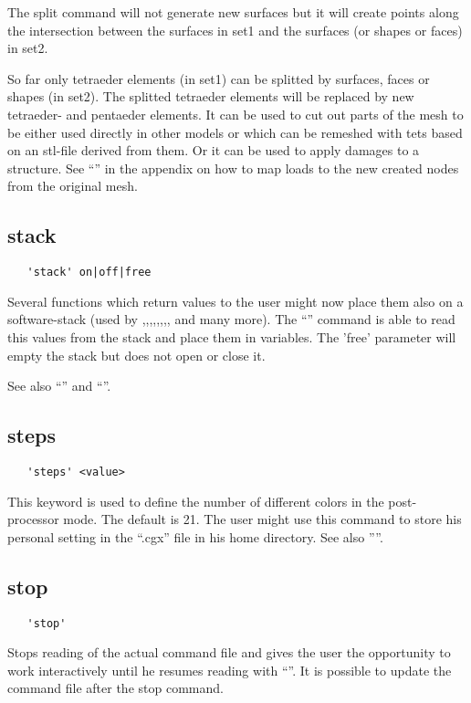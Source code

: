 \documentclass{article}
\begin{document}
The split command will not generate new surfaces but it will create points along the intersection between the surfaces in set1 and the surfaces (or shapes or faces) in set2.

So far only tetraeder elements (in set1) can be splitted by surfaces, faces or shapes (in set2). The splitted tetraeder elements will be replaced by new tetraeder- and pentaeder elements. It can be used to cut out parts of the mesh to be either used directly in other models or which can be remeshed with tets based on an stl-file derived from them. Or it can be used to apply damages to a structure. See ``'' in the appendix on how to map loads to the new created nodes from the original mesh.

\subsection{\label{stack}stack}
\begin{verbatim}
   'stack' on|off|free
\end{verbatim}
Several functions which return values to the user might now place them also on a software-stack (used by ,,,,,,,, and many more). The ``'' command is able to read this values from the stack and place them in variables. The 'free' parameter will empty the stack but does not open or close it.

See also ``'' and ``''.

\subsection{\label{steps}steps}
\begin{verbatim}
   'steps' <value> 
\end{verbatim}
This keyword is used to define the number of different colors in the post-processor mode. The default is 21. The user might use this command to store his personal setting in the ``.cgx'' file in his home directory. See also ''''.

\subsection{\label{stop}stop}
\begin{verbatim}
   'stop'
\end{verbatim}
Stops reading of the actual command file and gives the user the opportunity to work interactively until he resumes reading with ``''. It is possible to update the command file after the stop command.
\end{document}

